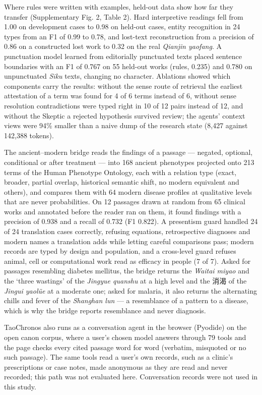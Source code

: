 \documentclass[
]{article}
\begin{document}
Where rules were written with examples, held-out data show how far they
transfer (Supplementary Fig. 2, Table 2). Hard interpretive readings
fell from 1.00 on development cases to 0.98 on held-out cases, entity
recognition in 24 types from an F1 of 0.99 to 0.78, and lost-text
reconstruction from a precision of 0.86 on a constructed lost work to
0.32 on the real \emph{Qianjin yaofang}. A punctuation model learned
from editorially punctuated texts placed sentence boundaries with an F1
of 0.767 on 55 held-out works (rules, 0.235) and 0.780 on unpunctuated
\emph{Siku} texts, changing no character. Ablations showed which
components carry the results: without the sense route of retrieval the
earliest attestation of a term was found for 4 of 6 terms instead of 6,
without sense resolution contradictions were typed right in 10 of 12
pairs instead of 12, and without the Skeptic a rejected hypothesis
survived review; the agents' context views were 94\% smaller than a
naive dump of the research state (8,427 against 142,388 tokens).

The ancient--modern bridge reads the findings of a passage --- negated,
optional, conditional or after treatment --- into 168 ancient phenotypes
projected onto 213 terms of the Human Phenotype Ontology, each with a
relation type (exact, broader, partial overlap, historical semantic
shift, no modern equivalent and others), and compares them with 64
modern disease profiles at qualitative levels that are never
probabilities. On 12 passages drawn at random from 65 clinical works and
annotated before the reader ran on them, it found findings with a
precision of 0.938 and a recall of 0.732 (F1 0.822). A presentism guard
handled 24 of 24 translation cases correctly, refusing equations,
retrospective diagnoses and modern names a translation adds while
letting careful comparisons pass; modern records are typed by design and
population, and a cross-level guard refuses animal, cell or
computational work read as efficacy in people (7 of 7). Asked for
passages resembling diabetes mellitus, the bridge returns the
\emph{Waitai miyao} and the `three wastings' of the \emph{Jingyue
quanshu} at a high level and the 消渴 of the \emph{Jingui yaolüe} at a
moderate one; asked for malaria, it also returns the alternating chills
and fever of the \emph{Shanghan lun} --- a resemblance of a pattern to a
disease, which is why the bridge reports resemblance and never
diagnosis.

TaoChronos also runs as a conversation agent in the browser (Pyodide) on
the open canon corpus, where a user's chosen model answers through 79
tools and the page checks every cited passage word for word (verbatim,
misquoted or no such passage). The same tools read a user's own records,
such as a clinic's prescriptions or case notes, made anonymous as they
are read and never recorded; this path was not evaluated here.
Conversation records were not used in this study.
\end{document}
